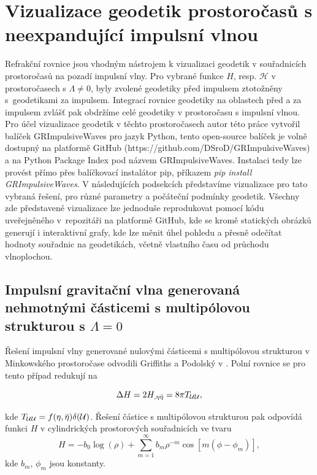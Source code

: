 \section{Vizualizace geodetik prostoročasů s neexpandující impulsní vlnou}
Refrakční rovnice jsou vhodným nástrojem k vizualizaci geodetik v souřadnicích prostoročasů na pozadí impulsní vlny.
Pro vybrané funkce $H$, resp. $\mathcal{H}$ v prostoročasech s $\Lambda \neq 0$, byly zvolené geodetiky před impulsem ztotožněny
s~geodetikami za impulsem. Integrací rovnice geodetiky na oblastech před a za impulsem zvlášť pak obdržíme celé geodetiky v prostoročasu s
impulsní vlnou. Pro účel vizualizace geodetik v těchto prostoročasech autor této práce vytvořil balíček GRImpulsiveWaves pro jazyk Python,
tento open-source balíček je volně dostupný na platformě GitHub (https://github.com/DSroD/GRImpulsiveWaves) a na Python Package Index pod názvem
GRImpulsiveWaves. Instalaci tedy lze provést přímo přes balíčkovací instalátor pip, příkazem \textit{pip install GRImpulsiveWaves}. V následujících podsekcích
představíme vizualizace pro tato vybraná řešení, pro různé parametry a počáteční podmínky geodetik. Všechny zde představené vizualizace lze jednoduše reprodukovat
pomocí kódu uveřejněného v~repozitáři na platformě GitHub, kde se kromě statických obrázků generují i interaktivní grafy, kde lze měnit úhel pohledu a přesně odečítat
hodnoty souřadnic na geodetikách, včetně vlastního času od průchodu vlnoplochou.

\subsection{Impulsní gravitační vlna generovaná nehmotnými částicemi s multipólovou strukturou s $\Lambda=0$}

Řešení impulsní vlny generované nulovými částicemi s multipólovou strukturou v Minkowského prostoročase odvodili
Griffiths a Podolský v \cite{Griffiths_1997}. Polní rovnice se pro tento případ redukují na

\begin{equation}
    \label{eq:podminka_na_H}
    \Delta H = 2 H_{,\eta \bar{\eta}} = 8 \pi T_{\mathcal{U} \mathcal{U}},
\end{equation}
 
kde $T_{\mathcal{U} \mathcal{U}} = f(\eta, \bar{\eta}) \delta(\mathcal{U})$. Řešení částice s multipólovou strukturou pak odpovídá funkci $H$ v cylindrických prostorových souřadnicích ve tvaru
\begin{equation}
    \label{eq:multipole_minkowski}
    H = -b_0 \log(\rho) + \sum_{m=1}^\infty b_m \rho^{-m} \cos\left[ m \left(\phi - \phi_m \right) \right],
\end{equation}
kde $b_m$, $\phi_m$ jsou konstanty.

